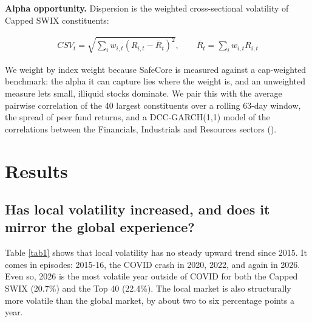\documentclass[11pt,preprint]{elsarticle}
\numberwithin{equation}{section}
\numberwithin{figure}{section}
\numberwithin{table}{section}
\begin{document}
\textbf{Alpha opportunity.} Dispersion is the weighted cross-sectional
volatility of Capped SWIX constituents:

\begin{align}
CSV_t = \sqrt{\sum_{i} w_{i,t} \left(R_{i,t} - \bar{R}_t\right)^2}, \qquad \bar{R}_t = \sum_i w_{i,t} R_{i,t} \label{eq2}
\end{align}

We weight by index weight because SafeCore is measured against a
cap-weighted benchmark: the alpha it can capture lies where the weight
is, and an unweighted measure lets small, illiquid stocks dominate. We
pair this with the average pairwise correlation of the 40 largest
constituents over a rolling 63-day window, the spread of peer fund
returns, and a DCC-GARCH(1,1) model of the correlations between the
Financials, Industrials and Resources sectors
().

\section{\texorpdfstring{Results
\label{Results}}{Results }}\label{results}

\subsection{Has local volatility increased, and does it mirror the
global
experience?}\label{has-local-volatility-increased-and-does-it-mirror-the-global-experience}

Table \ref{tab1} shows that local volatility has no steady upward trend
since 2015. It comes in episodes: 2015-16, the COVID crash in 2020,
2022, and again in 2026. Even so, 2026 is the most volatile year outside
of COVID for both the Capped SWIX (20.7\%) and the Top 40 (22.4\%). The
local market is also structurally more volatile than the global market,
by about two to six percentage points a year.
\end{document}
